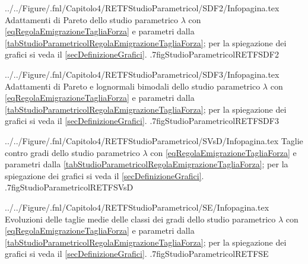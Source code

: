                     {../../Figure/.fnl/Capitolo4/RETFStudioParametricol/SDF2/Infopagina.tex}
                    {Adattamenti di Pareto dello studio parametrico \(\lambda\) con \ref{eqRegolaEmigrazioneTagliaForza} e parametri dalla \cref{tabStudioParametricolRegolaEmigrazioneTagliaForza}; per la spiegazione dei grafici si veda il \cref{secDefinizioneGrafici}.}
                    {.7\linewidth}{figStudioParametricolRETFSDF2}

                    {../../Figure/.fnl/Capitolo4/RETFStudioParametricol/SDF3/Infopagina.tex}
                    {Adattamenti di Pareto e lognormali bimodali dello studio parametrico \(\lambda\) con \ref{eqRegolaEmigrazioneTagliaForza} e parametri dalla \cref{tabStudioParametricolRegolaEmigrazioneTagliaForza}; per la spiegazione dei grafici si veda il \cref{secDefinizioneGrafici}.}
                    {.7\linewidth}{figStudioParametricolRETFSDF3}

                    {../../Figure/.fnl/Capitolo4/RETFStudioParametricol/SVsD/Infopagina.tex}
                    {Taglie contro gradi dello studio parametrico \(\lambda\) con \ref{eqRegolaEmigrazioneTagliaForza} e parametri dalla \cref{tabStudioParametricolRegolaEmigrazioneTagliaForza}; per la spiegazione dei grafici si veda il \cref{secDefinizioneGrafici}.}
                    {.7\linewidth}{figStudioParametricolRETFSVsD}

                    {../../Figure/.fnl/Capitolo4/RETFStudioParametricol/SE/Infopagina.tex}
                    {Evoluzioni delle taglie medie delle classi dei gradi dello studio parametrico \(\lambda\) con \ref{eqRegolaEmigrazioneTagliaForza} e parametri dalla \cref{tabStudioParametricolRegolaEmigrazioneTagliaForza}; per la spiegazione dei grafici si veda il \cref{secDefinizioneGrafici}.}
                    {.7\linewidth}{figStudioParametricolRETFSE}

